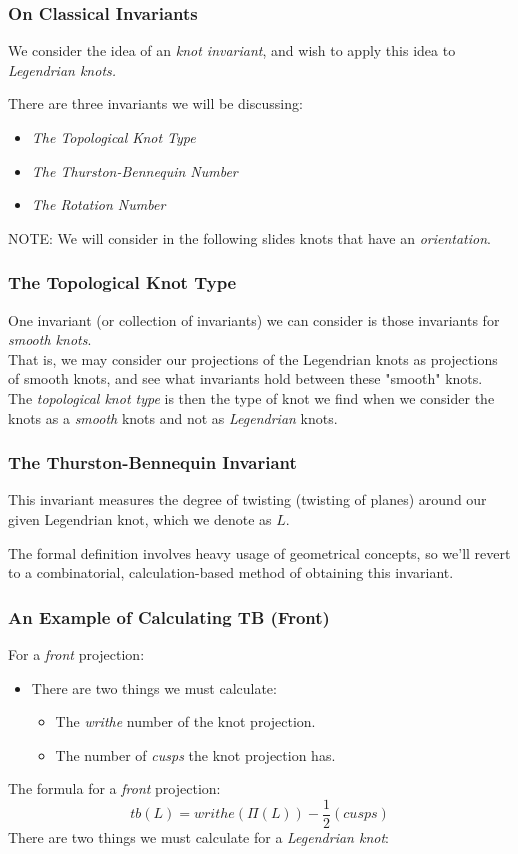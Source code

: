 \documentclass{beamer}
\begin{document}
\begin{frame}
    \frametitle{On Classical Invariants}
    We consider the idea of an \textit{knot invariant}, and wish to
    apply this idea to \textit{Legendrian knots.}

    There are three invariants we will be discussing:
    \begin{itemize}
        \item \textit{The Topological Knot Type}
        \item \textit{The Thurston-Bennequin Number}
        \item \textit{The Rotation Number}
    \end{itemize}
    \alert{NOTE}: We will consider in the following slides knots
    that have an \textit{orientation}.
\end{frame}

\begin{frame}
    \frametitle{The Topological Knot Type}
    One invariant (or collection of invariants) we can consider
    is those invariants for \textit{smooth knots}. \\
    That is, we may consider our projections of the Legendrian knots
    as projections of smooth knots, and see what invariants hold
    between these "smooth" knots. \\
    The \textit{topological knot type} is then the type of knot we find
    when we consider the knots as a \textit{smooth} knots and not as 
    \textit{Legendrian} knots. \\
   
\end{frame}

\begin{frame}
    \frametitle{The Thurston-Bennequin Invariant}
    \begin{definition}
    This invariant measures the degree of twisting (twisting of planes)
    around our given Legendrian knot, which we denote as $L.$
\end{definition}
The formal definition involves heavy usage of geometrical concepts,
so we'll revert to a combinatorial, calculation-based method of
obtaining this invariant.
\end{frame}
\begin{frame}
    \frametitle{An Example of Calculating TB (Front)}
    For a \textit{front} projection:
    \begin{itemize}
        \item There are two things we must calculate:
        \begin{itemize}
            \item The \textit{writhe} number of the knot projection.
            \item The number of \textit{cusps} the knot projection has.
        \end{itemize}
    \end{itemize}
    The formula for a \textit{front} projection:
    \[tb(L) = writhe(\Pi(L)) - \frac{1}{2}(cusps)\]
    There are two things we must calculate for a \textit{Legendrian knot}:
\end{frame}
\end{document}
